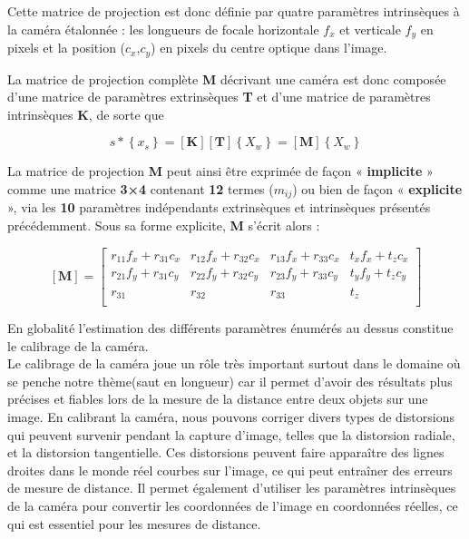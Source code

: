   Cette matrice de projection est donc définie par quatre paramètres intrinsèques à la caméra étalonnée : les longueurs de focale horizontale $f_x$ et verticale $f_y$ en pixels et la position ($c_x$,$c_y$) en pixels du centre optique dans l’image.
  
  La matrice de projection complète \textbf{M} décrivant une caméra est donc composée d’une matrice de paramètres extrinsèques \textbf{T} et d’une matrice de paramètres intrinsèques \textbf{K}, de sorte que
  
   \begin{equation}
  s
  *
  \left\{ x_s \right\}
  =
  \left[ \textbf{K} \right] 
  \left[ \textbf{T} \right]
  \left\{ X_w \right\} 
  =
  \left[ \textbf{M} \right]
  \left\{ X_w \right\} 
\end{equation}
  
  La matrice de projection \textbf{M} peut ainsi être exprimée de façon « \textbf{implicite} » comme une matrice \textbf{3×4} contenant \textbf{12} termes ($m_{ij}$) ou bien de façon « \textbf{explicite} », via les \textbf{10} paramètres indépendants extrinsèques et intrinsèques présentés précédemment. Sous sa forme explicite, \textbf{M} s’écrit alors :
  
   \begin{equation}
  \left[ \textbf{M} \right]
  =
  \left[ 
  \begin{array}{cccc}
  	r_{11}f_x + r_{31}c_x & r_{12}f_x + r_{32}c_x & r_{13}f_x + r_{33}c_x & t_xf_x + t_zc_x \\
  	r_{21}f_y + r_{31}c_y & r_{22}f_y + r_{32}c_y & r_{23}f_y + r_{33}c_y & t_yf_y + t_zc_y \\
  	r_{31} & r_{32} & r_{33} & t_z\\
  \end{array}
  \right]
\end{equation}
  
  En globalité l'estimation des différents paramètres énumérés au dessus constitue le calibrage de la caméra.\\
  
 
 
  Le calibrage de la caméra joue un rôle très important surtout dans le domaine où se penche notre thème(saut en longueur) car il permet d'avoir des résultats plus précises et fiables lors de la mesure de la distance entre deux objets sur une image. 
  En calibrant la caméra, nous pouvons corriger divers types de distorsions qui peuvent survenir pendant la capture d'image, telles que la distorsion radiale, et la distorsion tangentielle. Ces distorsions peuvent faire apparaître des lignes droites dans le monde réel courbes sur l'image, ce qui peut entraîner des erreurs de mesure de distance.
  Il permet également d'utiliser les paramètres intrinsèques de la caméra pour convertir les coordonnées de l'image en coordonnées réelles, ce qui est essentiel pour les mesures de distance.\\
  
